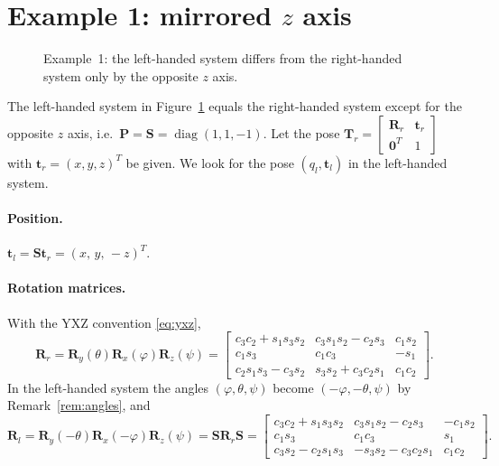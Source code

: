\documentclass{article}
\theoremstyle{plain}
\theoremstyle{definition}
\newcommand{\vect}[1]{\boldsymbol{#1}}
\newcommand{\coordframe}[8]{%
  \begin{scope}[scale=1.5, x={#1}, y={#2}, z={#3}]
    \draw[axis] (0,0,0) -- (1.8,0,0) node[pos=1.07, black] {$x$};
    \draw[axis] (0,0,0) -- (0,1.8,0) node[pos=1.07, black] {$y$};
    \draw[axis] (0,0,0) -- (0,0,1.8) node[pos=1.07, black] {$z$};
    \draw[rot] plot[domain=35:315, smooth, samples=40, variable=\t]
      ({1.25}, {0.32*cos(\t)}, {0.32*sin(\t)});
    \draw[rot] plot[domain=35:315, smooth, samples=40, variable=\t]
      ({0.32*sin(\t)}, {1.25}, {0.32*cos(\t)});
    \draw[rot] plot[domain=35:315, smooth, samples=40, variable=\t]
      ({0.32*cos(\t)}, {0.32*sin(\t)}, {1.25});
    \node[angle] at ({1.25}, {0.6*cos(215)}, {0.6*sin(215)}) {#5};
    \node[angle] at ({0.6*sin(215)}, {1.25}, {0.6*cos(215)}) {#6};
    \node[angle] at ({0.6*cos(215)}, {0.6*sin(215)}, {1.25}) {#7};
  \end{scope}
  \node[font=\bfseries\small] at (1.4,#8) {#4};
}
\begin{document}
\section{Example 1: mirrored \texorpdfstring{$z$}{z} axis}\label{sec:ex1}

\begin{figure}[H]
  \centering
  \caption{Example~1: the left-handed system differs from the right-handed system only by the
  opposite $z$ axis.}
  \label{fig:ex1}
\end{figure}

The left-handed system in Figure~\ref{fig:ex1} equals the right-handed system except for the
opposite $z$ axis, i.e.\ $\vect P = \vect S = \operatorname{diag}(1,1,-1)$. Let the pose
$\vect T_r = \begin{bmatrix} \vect R_r & \vect t_r \\ \vect 0^T & 1 \end{bmatrix}$ with
$\vect t_r = (x, y, z)^T$ be given. We look for the pose $(q_l, \vect t_l)$ in the left-handed
system.

\paragraph{Position.} $\vect t_l = \vect S \vect t_r = (x,\, y,\, -z)^T$.

\paragraph{Rotation matrices.} With the YXZ convention \eqref{eq:yxz},
\begin{equation}
  \vect R_r = \vect R_y(\theta)\vect R_x(\varphi)\vect R_z(\psi) =
  \begin{bmatrix}
    c_3c_2 + s_1s_3s_2 & c_3s_1s_2 - c_2s_3 & c_1s_2 \\
    c_1s_3 & c_1c_3 & -s_1 \\
    c_2s_1s_3 - c_3s_2 & s_3s_2 + c_3c_2s_1 & c_1c_2
  \end{bmatrix}.
\end{equation}
In the left-handed system the angles $(\varphi, \theta, \psi)$ become $(-\varphi, -\theta, \psi)$
by Remark~\ref{rem:angles}, and
\begin{equation}
  \vect R_l = \vect R_y(-\theta)\vect R_x(-\varphi)\vect R_z(\psi) = \vect S \vect R_r \vect S =
  \begin{bmatrix}
    c_3c_2 + s_1s_3s_2 & c_3s_1s_2 - c_2s_3 & -c_1s_2 \\
    c_1s_3 & c_1c_3 & s_1 \\
    c_3s_2 - c_2s_1s_3 & -s_3s_2 - c_3c_2s_1 & c_1c_2
  \end{bmatrix}.
\end{equation}
\end{document}
